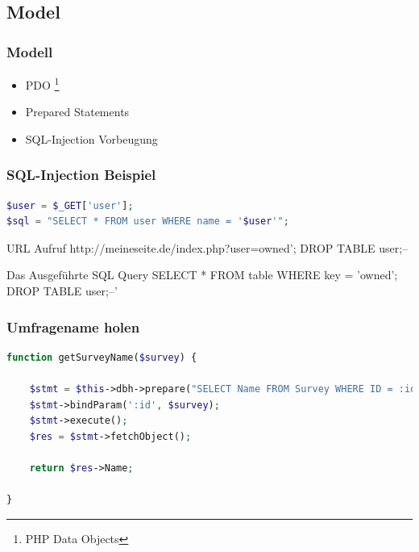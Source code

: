 \documentclass[xcolor=dvipsnames]{beamer}
\begin{document}
\subsection{Model}
\begin{frame} %
  \frametitle{Modell} %
  \begin{block}{}
	  \begin{itemize}
  		\item PDO \footnote{PHP Data Objects}
  		\item Prepared Statements
  		\item SQL-Injection Vorbeugung
	  \end{itemize}
  \end{block} 
\end{frame}

\begin{frame}[fragile] %
  \frametitle{SQL-Injection Beispiel} %

\begin{lstlisting}[language=PHP, caption=PHP Code der nicht Existieren sollte!!]
$user = $_GET['user'];
$sql = "SELECT * FROM user WHERE name = '$user'";
\end{lstlisting} 

\begin{block}{URL Aufruf}
http://meineseite.de/index.php?user=owned'; DROP TABLE user;--
\end{block}
 
  \begin{alertblock}{Das Ausgeführte SQL Query}
SELECT * FROM table WHERE key = 'owned'; DROP TABLE user;--'
	\end{alertblock} 


\end{frame}

\begin{frame}[fragile] %
  \frametitle{Umfragename holen} %

\begin{lstlisting}[language=PHP, caption=getSurveyName Funktion]
function getSurveyName($survey) {
		
    $stmt = $this->dbh->prepare("SELECT Name FROM Survey WHERE ID = :id");
    $stmt->bindParam(':id', $survey);
    $stmt->execute();
    $res = $stmt->fetchObject();

    return $res->Name;
		
}
\end{lstlisting} 
\end{frame}
\end{document}

